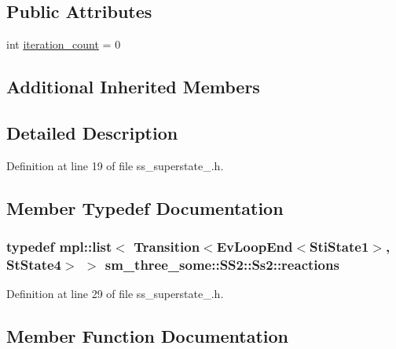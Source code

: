 \subsection*{Public Attributes}
\begin{DoxyCompactItemize}
\item 
int \hyperlink{structsm__three__some_1_1SS2_1_1Ss2_ad0f43df403bcb029afb07a0f52699c60}{iteration\+\_\+count} = 0
\end{DoxyCompactItemize}
\subsection*{Additional Inherited Members}


\subsection{Detailed Description}


Definition at line 19 of file ss\+\_\+superstate\+\_.\+h.



\subsection{Member Typedef Documentation}
\subsubsection[{\texorpdfstring{reactions}{reactions}}]{\setlength{\rightskip}{0pt plus 5cm}typedef mpl\+::list$<$ Transition$<$Ev\+Loop\+End$<${\bf Sti\+State1}$>$, {\bf St\+State4}$>$ $>$ {\bf sm\+\_\+three\+\_\+some\+::\+S\+S2\+::\+Ss2\+::reactions}}\hypertarget{structsm__three__some_1_1SS2_1_1Ss2_a7b8b6caf125da7746c3158cee533442b}{}\label{structsm__three__some_1_1SS2_1_1Ss2_a7b8b6caf125da7746c3158cee533442b}


Definition at line 29 of file ss\+\_\+superstate\+\_.\+h.



\subsection{Member Function Documentation}
